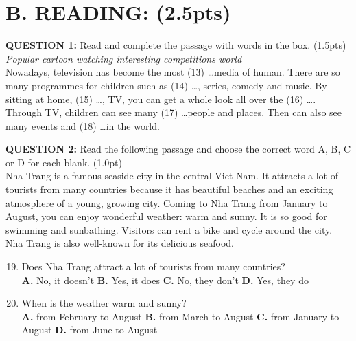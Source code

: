 \documentclass[a4paper,12pt]{article}
\begin{document}
\section*{B. READING: (2.5pts)}

\textbf{QUESTION 1:} Read and complete the passage with words in the box. (1.5pts) \\
\textit{Popular \quad cartoon \quad watching \quad interesting \quad competitions \quad world} \\
Nowadays, television has become the most (13) \ldots media of human. There are so many programmes for children such as (14) \ldots, series, comedy and music. By sitting at home, (15) \ldots, TV, you can get a whole look all over the (16) \ldots . Through TV, children can see many (17) \ldots people and places. Then can also see many events and (18) \ldots in the world.

\vspace{0.5cm}

\textbf{QUESTION 2:} Read the following passage and choose the correct word A, B, C or D for each blank. (1.0pt) \\
Nha Trang is a famous seaside city in the central Viet Nam. It attracts a lot of tourists from many countries because it has beautiful beaches and an exciting atmosphere of a young, growing city. Coming to Nha Trang from January to August, you can enjoy wonderful weather: warm and sunny. It is so good for swimming and sunbathing. Visitors can rent a bike and cycle around the city. Nha Trang is also well-known for its delicious seafood. \\
\begin{enumerate}[label=\arabic*.]
      \setcounter{enumi}{18}
      \item Does Nha Trang attract a lot of tourists from many countries? \\
            \textbf{A.} No, it doesn’t \quad \textbf{B.} Yes, it does \quad \textbf{C.} No, they don’t \quad \textbf{D.} Yes, they do
      \item When is the weather warm and sunny? \\
            \textbf{A.} from February to August \quad \textbf{B.} from March to August \quad \textbf{C.} from January to August \quad \textbf{D.} from June to August
\end{enumerate}
\end{document}
